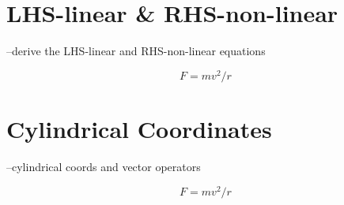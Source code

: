 %
%

\appendix
\section{LHS-linear \& RHS-non-linear}
\label{app:LHS_RHS}

--derive the LHS-linear and RHS-non-linear equations

\begin{equation}
F=mv^2/r
\end{equation}

\section{Cylindrical Coordinates}
\label{app:cylcoords}

--cylindrical coords and vector operators

\begin{equation}
F=mv^2/r
\end{equation}

